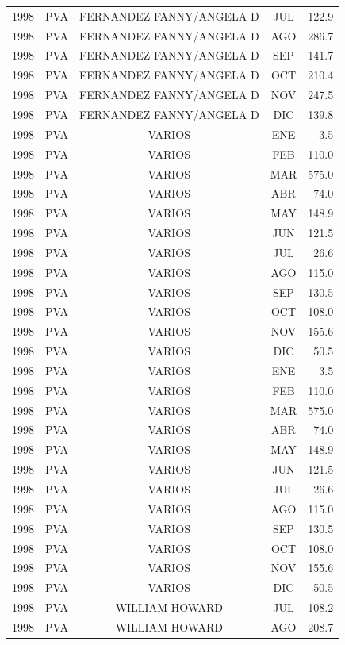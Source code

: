 \documentclass[12pt,]{article}
\begin{document}
\begin{table}[ht]
{\begin{tabular}{lcccr}
  1998 & PVA & FERNANDEZ FANNY/ANGELA D & JUL & 122.9 \\ 
  1998 & PVA & FERNANDEZ FANNY/ANGELA D & AGO & 286.7 \\ 
  1998 & PVA & FERNANDEZ FANNY/ANGELA D & SEP & 141.7 \\ 
  1998 & PVA & FERNANDEZ FANNY/ANGELA D & OCT & 210.4 \\ 
  1998 & PVA & FERNANDEZ FANNY/ANGELA D & NOV & 247.5 \\ 
  1998 & PVA & FERNANDEZ FANNY/ANGELA D & DIC & 139.8 \\ 
  1998 & PVA & VARIOS & ENE & 3.5 \\ 
  1998 & PVA & VARIOS & FEB & 110.0 \\ 
  1998 & PVA & VARIOS & MAR & 575.0 \\ 
  1998 & PVA & VARIOS & ABR & 74.0 \\ 
  1998 & PVA & VARIOS & MAY & 148.9 \\ 
  1998 & PVA & VARIOS & JUN & 121.5 \\ 
  1998 & PVA & VARIOS & JUL & 26.6 \\ 
  1998 & PVA & VARIOS & AGO & 115.0 \\ 
  1998 & PVA & VARIOS & SEP & 130.5 \\ 
  1998 & PVA & VARIOS & OCT & 108.0 \\ 
  1998 & PVA & VARIOS & NOV & 155.6 \\ 
  1998 & PVA & VARIOS & DIC & 50.5 \\ 
  1998 & PVA & VARIOS & ENE & 3.5 \\ 
  1998 & PVA & VARIOS & FEB & 110.0 \\ 
  1998 & PVA & VARIOS & MAR & 575.0 \\ 
  1998 & PVA & VARIOS & ABR & 74.0 \\ 
  1998 & PVA & VARIOS & MAY & 148.9 \\ 
  1998 & PVA & VARIOS & JUN & 121.5 \\ 
  1998 & PVA & VARIOS & JUL & 26.6 \\ 
  1998 & PVA & VARIOS & AGO & 115.0 \\ 
  1998 & PVA & VARIOS & SEP & 130.5 \\ 
  1998 & PVA & VARIOS & OCT & 108.0 \\ 
  1998 & PVA & VARIOS & NOV & 155.6 \\ 
  1998 & PVA & VARIOS & DIC & 50.5 \\ 
  1998 & PVA & WILLIAM HOWARD & JUL & 108.2 \\ 
  1998 & PVA & WILLIAM HOWARD & AGO & 208.7 \\ 

\end{tabular}}
\end{table}
\end{document}
